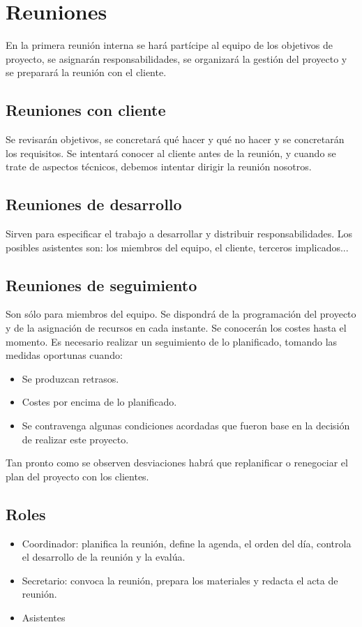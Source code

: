 \documentclass{article}
\begin{document}
\section{Reuniones}
En la primera reunión interna se hará partícipe al equipo de los objetivos de proyecto, se asignarán responsabilidades, se organizará la gestión del proyecto y se preparará la reunión con el cliente.
\subsection{Reuniones con cliente}
Se revisarán objetivos, se concretará qué hacer y qué no hacer y se concretarán los requisitos. 
Se intentará conocer al cliente antes de la reunión, y cuando se trate de aspectos técnicos, debemos intentar dirigir la reunión nosotros.

\subsection{Reuniones de desarrollo}
Sirven para especificar el trabajo a desarrollar y distribuir responsabilidades. Los posibles asistentes son: los miembros del equipo, el cliente, terceros implicados...

\subsection{Reuniones de seguimiento}
Son sólo para miembros del equipo. Se dispondrá de la programación del proyecto y de la asignación de recursos en cada instante. Se conocerán los costes hasta el momento. 
Es necesario realizar un seguimiento de lo planificado, tomando las medidas oportunas cuando:
\begin{itemize}
	\item Se produzcan retrasos.
	\item Costes por encima de lo planificado.
	\item Se contravenga algunas condiciones acordadas que fueron base en la decisión de realizar este proyecto. 
\end{itemize}
Tan pronto como se observen desviaciones habrá que replanificar o renegociar el plan del proyecto con los clientes. 
\subsection{Roles}
\begin{itemize}
	\item Coordinador: planifica la reunión, define la agenda, el orden del día, controla el desarrollo de la reunión y la evalúa. 
	\item Secretario: convoca la reunión, prepara los materiales y redacta el acta de reunión.
	\item Asistentes
\end{itemize}
\end{document}
